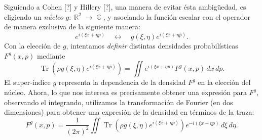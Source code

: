 \documentclass[a4paper]{report}
\DeclareMathOperator{\R}{\mathbb{R}}
\DeclareMathOperator{\C}{\mathbb{C}}
\DeclareMathOperator{\Tr}{Tr}
\begin{document}
  Siguiendo a Cohen [?] y Hillery [?], una manera de evitar
  ésta ambigüedad, es eligiendo un \textit{núcleo} $g : \R^2
  \to \C$, y asociando la función escalar con el operador de
  manera exclusiva de la siguiente manera:
  \begin{equation}
    e^{i\left( \xi x + \eta p \right)}
    \quad \leftrightarrow \quad
    g(\xi,\eta)e^{i\left( \xi \hat{x} + \eta
  \hat{p} \right)}.
  \end{equation}
  Con la elección de $g$, intentamos \textit{definir}
  distintas densidades probabilísticas $F^{g}(x,p)$ mediante
  \begin{equation}
    \Tr\left(
      \rho g(\xi,\eta)
      e^{i(\xi \hat{x} + \eta \hat{p})}
    \right)
    = \iint e^{i(\xi x + \eta p)}F^{g}(x,p) \, dx \, dp.
  \end{equation}
  El super-índice $g$ representa la dependencia de la
  densidad $F^{g}$ en la elección del núcleo. Ahora, lo que
  nos interesa es precisamente obtener una expresión para
  $F^{g}$, observando el integrando, utilizamos la
  transformación de Fourier (en dos dimensiones) para
  obtener una expresión de la densidad en términos de la
  traza:
  \begin{equation}
    F^{g}(x,p)
    = \frac{1}{(2\pi)^2} \iint \Tr\left( \rho g(\xi,\eta)
      e^{i\left( \xi \hat{x} + \eta \hat{p} \right)} \right)
      e^{-i\left( \xi x + \eta p\right)} \, d\xi \, d\eta.
  \end{equation}
\end{document}
